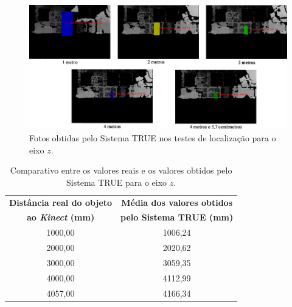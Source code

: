 
	\begin{figure}[htb]
		\begin{center}
			\includegraphics[width=1.0\textwidth]{figuras/5.Testes/eixoz-imgs2.png}
		\end{center}
		\caption{Fotos obtidas pelo Sistema TRUE nos testes de localização para o eixo $\displaystyle z$.}
		\label{fig:distancias}
	\end{figure}

	\begin{table}[h]
		\begin{center}
			\caption{Comparativo entre os valores reais e os valores obtidos pelo Sistema
			TRUE para o eixo $\displaystyle z$.}
			\label{tab:valores-z}
			\begin{tabular}{|c|c|}
				\hline \bf Distância real do objeto & \bf Média dos valores obtidos\\
							 \bf ao \textit{Kinect} (mm) & \bf pelo Sistema TRUE (mm)\\

				\hline
				\hline 1000,00 & 1006,24 \\ %
				\hline 2000,00 & 2020,62 \\ %
				\hline 3000,00 & 3059,35 \\ %
				\hline 4000,00 & 4112,99 \\ %
				\hline 4057,00 & 4166,34 \\ %
				\hline
			\end{tabular}
		\end{center}
	\end{table}

